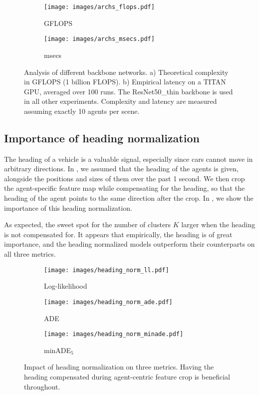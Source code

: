 \documentclass{article}
\begin{document}
\begin{figure*}[!htbp]
\centering
  \begin{subfigure}[b]{0.35\textwidth}
    \texttt{[image: images/archs\_flops.pdf]}
    \caption{GFLOPS}
    \label{fig:archs_flops}
  \end{subfigure}
  \begin{subfigure}[b]{0.35\textwidth}
    \texttt{[image: images/archs\_msecs.pdf]}
    \caption{msecs}
    \label{fig:archs_msecs}
  \end{subfigure}
\caption{Analysis of different backbone networks. a) Theoretical complexity in GFLOPS (1 billion FLOPS). b) Empirical latency on a TITAN GPU, averaged over 100 runs. The ResNet50\_thin backbone is used in all other experiments. Complexity and latency are measured assuming exactly 10 agents per scene.
}
\label{fig:archs}
\end{figure*}



\subsection{Importance of heading normalization}
\label{sec:normalizaton}


The heading of a vehicle is a valuable signal, especially since cars cannot move in arbitrary directions. In , we assumed that the heading of the agents is given, alongside the positions and sizes of them over the past 1 second. We then crop the agent-specific feature map while compensating for the heading, so that the heading of the agent points to the same direction after the crop. In , we show the importance of this heading normalization.

As expected, the sweet spot for the number of clusters $K$ larger when the heading is not compensated for. It appears that empirically, the heading is of great importance, and the heading normalized models outperform their counterparts on all three metrics.


\begin{figure*}[!htbp]
\centering
  \begin{subfigure}[b]{0.32\textwidth}
    \texttt{[image: images/heading\_norm\_ll.pdf]}
    \caption{Log-likelihood}
    \label{fig:heading_norm_ll}
  \end{subfigure}
  \begin{subfigure}[b]{0.32\textwidth}
    \texttt{[image: images/heading\_norm\_ade.pdf]}
    \caption{ADE}
    \label{fig:heading_norm_ade}
  \end{subfigure}
  \begin{subfigure}[b]{0.32\textwidth}
    \texttt{[image: images/heading\_norm\_minade.pdf]}
    \caption{minADE$_5$}
    \label{fig:heading_norm_minade}
  \end{subfigure}  
\caption{Impact of heading normalization on three metrics. Having the heading compensated during agent-centric feature crop is beneficial throughout.
}
\label{fig:heading}
\end{figure*}
\end{document}
